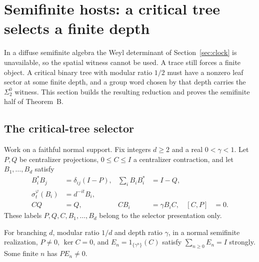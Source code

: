 \section{Semifinite hosts: a critical tree selects a finite depth}\label{sec:selector}
In a diffuse semifinite algebra the Weyl determinant of Section~\ref{sec:clock} is unavailable, so the spatial witness cannot be used. A trace still forces a finite object. A critical binary tree with modular ratio $1/2$ must have a nonzero leaf sector at some finite depth, and a group word chosen by that depth carries the $\Sigma^0_2$ witness. This section builds the resulting reduction and proves the semifinite half of Theorem~B.

\subsection{The critical-tree selector}
Work on a faithful normal support. Fix integers $d\ge2$ and a real $0<\gamma<1$. Let $P,Q$ be centralizer projections, $0\leq C\leq I$ a centralizer contraction, and let $B_1,\ldots,B_d$ satisfy
\begin{align}
 B_i^*B_j&=\delta_{ij}(I-P),&
 \sum_iB_iB_i^*&=I-Q,\label{eq:tree}\\
 \sigma_t^\varphi(B_i)&=d^{-it}B_i,\label{eq:modular}\\
 CQ&=Q,& CB_i&=\gamma B_iC,&[C,P]&=0.\label{eq:depth}
\end{align}
These labels $P,Q,C,B_1,\ldots,B_d$ belong to the selector presentation only.
\begin{lemma}\label{lem:selector}
For branching $d$, modular ratio $1/d$ and depth ratio $\gamma$, in a normal semifinite realization, $P\ne0$, $\ker C=0$, and $E_n=1_{\{\gamma^n\}}(C)$ satisfy $\sum_{n\geq0}E_n=I$ strongly. Some finite $n$ has $PE_n\ne0$.
\end{lemma}
